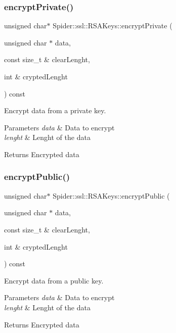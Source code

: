 \subsubsection{\texorpdfstring{encrypt\+Private()}{encryptPrivate()}}
{\footnotesize\ttfamily unsigned char$\ast$ Spider\+::ssl\+::\+R\+S\+A\+Keys\+::encrypt\+Private (\begin{DoxyParamCaption}\item[{unsigned char $\ast$}]{data,  }\item[{const size\+\_\+t \&}]{clear\+Lenght,  }\item[{int \&}]{crypted\+Lenght }\end{DoxyParamCaption}) const}



Encrypt data from a private key. 


\begin{DoxyParams}{Parameters}
{\em data} & Data to encrypt \\
\hline
{\em lenght} & Lenght of the data \\
\hline
\end{DoxyParams}
\begin{DoxyReturn}{Returns}
Encrypted data 
\end{DoxyReturn}
\mbox{\label{class_spider_1_1ssl_1_1_r_s_a_keys_a9e391f7d87fe9a8f58119629ed80f9bb}} 
\subsubsection{\texorpdfstring{encrypt\+Public()}{encryptPublic()}}
{\footnotesize\ttfamily unsigned char$\ast$ Spider\+::ssl\+::\+R\+S\+A\+Keys\+::encrypt\+Public (\begin{DoxyParamCaption}\item[{unsigned char $\ast$}]{data,  }\item[{const size\+\_\+t \&}]{clear\+Lenght,  }\item[{int \&}]{crypted\+Lenght }\end{DoxyParamCaption}) const}



Encrypt data from a public key. 


\begin{DoxyParams}{Parameters}
{\em data} & Data to encrypt \\
\hline
{\em lenght} & Lenght of the data \\
\hline
\end{DoxyParams}
\begin{DoxyReturn}{Returns}
Encrypted data 
\end{DoxyReturn}
\mbox{\label{class_spider_1_1ssl_1_1_r_s_a_keys_afec6c4762821ae4179adebbef1e4ee66}} 
